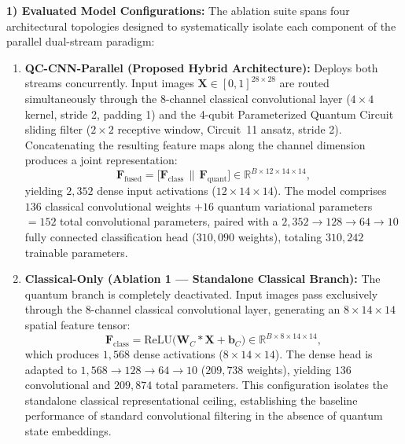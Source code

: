 \documentclass[pdflatex,sn-mathphys-num]{sn-jnl}%
\theoremstyle{thmstyleone}%
\theoremstyle{thmstyletwo}%
\theoremstyle{thmstylethree}%
\begin{document}
\textbf{1) Evaluated Model Configurations:}
The ablation suite spans four architectural topologies designed to systematically isolate each component of the parallel dual-stream paradigm:
\begin{enumerate}
    \item \textbf{QC-CNN-Parallel (Proposed Hybrid Architecture):} Deploys both streams concurrently. Input images $\mathbf{X} \in [0, 1]^{28 \times 28}$ are routed simultaneously through the 8-channel classical convolutional layer ($4 \times 4$ kernel, stride 2, padding 1) and the 4-qubit Parameterized Quantum Circuit sliding filter ($2 \times 2$ receptive window, Circuit~11 ansatz, stride 2). Concatenating the resulting feature maps along the channel dimension produces a joint representation:
    \begin{equation}
    \mathbf{F}_{\mathrm{fused}} = \big[ \mathbf{F}_{\mathrm{class}} \,\|\, \mathbf{F}_{\mathrm{quant}} \big] \in \mathbb{R}^{B \times 12 \times 14 \times 14},
    \label{eq:ablation_fused_tensor}
    \end{equation}
    yielding $2{,}352$ dense input activations ($12 \times 14 \times 14$). The model comprises $136$ classical convolutional weights $+ 16$ quantum variational parameters $= 152$ total convolutional parameters, paired with a $2{,}352 \to 128 \to 64 \to 10$ fully connected classification head ($310{,}090$ weights), totaling $310{,}242$ trainable parameters.

    \item \textbf{Classical-Only (Ablation 1 --- Standalone Classical Branch):} The quantum branch is completely deactivated. Input images pass exclusively through the 8-channel classical convolutional layer, generating an $8 \times 14 \times 14$ spatial feature tensor:
    \begin{equation}
    \mathbf{F}_{\mathrm{class}} = \mathrm{ReLU}\big( \mathbf{W}_C * \mathbf{X} + \mathbf{b}_C \big) \in \mathbb{R}^{B \times 8 \times 14 \times 14},
    \label{eq:classical_only_tensor}
    \end{equation}
    which produces $1{,}568$ dense activations ($8 \times 14 \times 14$). The dense head is adapted to $1{,}568 \to 128 \to 64 \to 10$ ($209{,}738$ weights), yielding $136$ convolutional and $209{,}874$ total parameters. This configuration isolates the standalone classical representational ceiling, establishing the baseline performance of standard convolutional filtering in the absence of quantum state embeddings.


\end{enumerate}
\end{document}
